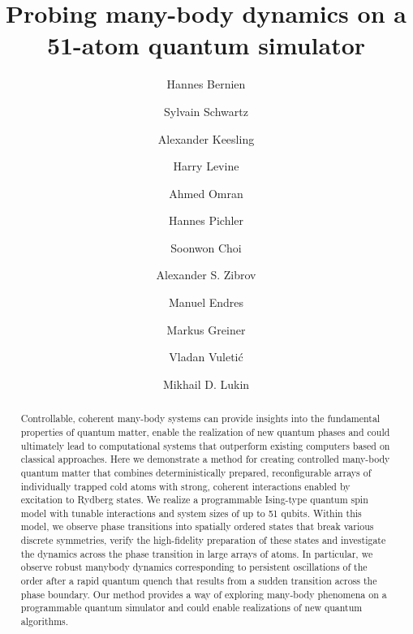 \documentclass[prl,nobalancelastpage,twocolumn,superscriptaddress,nofootinbib]{revtex4}
\begin{document}
\title{
Probing many-body dynamics on a 51-atom quantum simulator	
}


\newcommand{\Caltech}{Division of Physics, Mathematics and Astronomy, California Institute of Technology, Pasadena, CA 91125, USA}
\newcommand{\Harvard}{Department of Physics, Harvard University, Cambridge, MA 02138,
USA}
\newcommand{\mitaddress}{Department of Physics and Research Laboratory of Electronics, Massachusetts Institute of Technology,
Cambridge, MA 02139, USA}
\newcommand{\Itamp}{Institute for Theoretical Atomic, Molecular and Optical Physics, Harvard-Smithsonian Center for Astrophysics, Cambridge, MA 02138, USA}



\author{Hannes Bernien}
\address{\Harvard}

\author{Sylvain Schwartz}
\address{\Harvard}
\address{\mitaddress}

\author{Alexander Keesling}
\address{\Harvard}

\author{Harry Levine}
\address{\Harvard}

\author{Ahmed Omran}
\address{\Harvard}

\author{Hannes Pichler}
\address{\Itamp}
\address{\Harvard}

\author{Soonwon Choi}
\address{\Harvard}


\author{Alexander S. Zibrov}
\address{\Harvard}

\author{Manuel Endres}
\address{\Caltech}


\author{Markus Greiner}
\address{\Harvard}

\author{Vladan Vuleti\'c}
\address{\mitaddress}

\author{Mikhail D. Lukin}
\address{\Harvard}


\begin{abstract}
    Controllable, coherent many-body systems can provide insights into the
    fundamental properties of quantum matter, enable the realization of new
    quantum phases and could ultimately lead to computational systems that
    outperform existing computers based on classical approaches. Here we
    demonstrate a method for creating controlled many-body quantum matter that
    combines deterministically prepared, reconfigurable arrays of individually
    trapped cold atoms with strong, coherent interactions enabled by excitation
    to Rydberg states. We realize a programmable Ising-type quantum spin model
    with tunable interactions and system sizes of up to 51 qubits. Within this
    model, we observe phase transitions into spatially ordered states that
    break various discrete symmetries, verify the high-fidelity preparation of
    these states and investigate the dynamics across the phase transition in
    large arrays of atoms. In particular, we observe robust manybody dynamics
    corresponding to persistent oscillations of the order after a rapid quantum
    quench that results from a sudden transition across the phase boundary. Our
    method provides a way of exploring many-body phenomena on a programmable
    quantum simulator and could enable realizations of new quantum algorithms.
\end{abstract}
\end{document}
